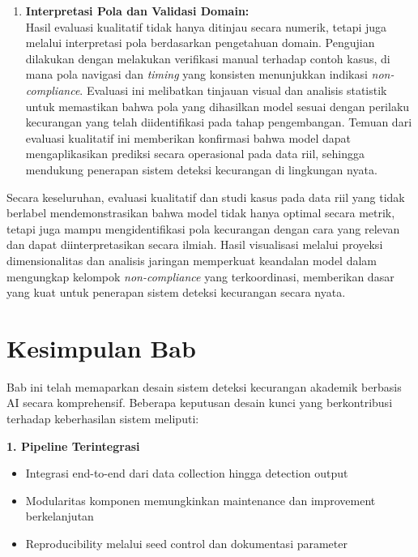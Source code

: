 \begin{enumerate}
    \item \textbf{Interpretasi Pola dan Validasi Domain:} \\
    Hasil evaluasi kualitatif tidak hanya ditinjau secara numerik, tetapi juga melalui interpretasi pola berdasarkan pengetahuan domain. Pengujian dilakukan dengan melakukan verifikasi manual terhadap contoh kasus, di mana pola navigasi dan \textit{timing} yang konsisten menunjukkan indikasi \textit{non-compliance}. Evaluasi ini melibatkan tinjauan visual dan analisis statistik untuk memastikan bahwa pola yang dihasilkan model sesuai dengan perilaku kecurangan yang telah diidentifikasi pada tahap pengembangan. Temuan dari evaluasi kualitatif ini memberikan konfirmasi bahwa model dapat mengaplikasikan prediksi secara operasional pada data riil, sehingga mendukung penerapan sistem deteksi kecurangan di lingkungan nyata.
\end{enumerate}

Secara keseluruhan, evaluasi kualitatif dan studi kasus pada data riil yang tidak berlabel mendemonstrasikan bahwa model tidak hanya optimal secara metrik, tetapi juga mampu mengidentifikasi pola kecurangan dengan cara yang relevan dan dapat diinterpretasikan secara ilmiah. Hasil visualisasi melalui proyeksi dimensionalitas dan analisis jaringan memperkuat keandalan model dalam mengungkap kelompok \textit{non-compliance} yang terkoordinasi, memberikan dasar yang kuat untuk penerapan sistem deteksi kecurangan secara nyata.

\section{Kesimpulan Bab}
\label{sec:kesimpulanBab3}

Bab ini telah memaparkan desain sistem deteksi kecurangan akademik berbasis AI secara komprehensif. Beberapa keputusan desain kunci yang berkontribusi terhadap keberhasilan sistem meliputi:

\textbf{1. Pipeline Terintegrasi}
\begin{itemize}
    \item Integrasi end-to-end dari data collection hingga detection output
    \item Modularitas komponen memungkinkan maintenance dan improvement berkelanjutan
    \item Reproducibility melalui seed control dan dokumentasi parameter
\end{itemize}

